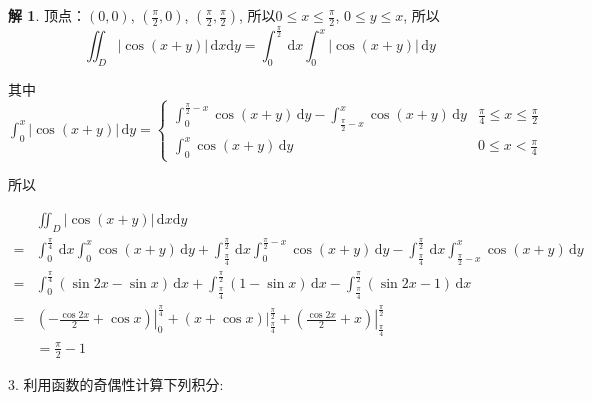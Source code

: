 \documentclass[a4paper,12pt]{article}
\theoremstyle{definition}
\newtheorem*{sol}{解}
\begin{document}
\begin{sol}
    顶点：$(0,0)$, $(\frac{\pi}{2},0)$, $(\frac{\pi}{2},\frac{\pi}{2})$, 所以$0\leq x\leq\frac{\pi}{2}$, $0\leq y\leq x$, 所以
    $$\iint_{D} \left|\cos(x+y)\right|\,\mathrm{d}x\mathrm{d}y=\int_0^{\frac{\pi}{2}}\,\mathrm{d}x\int_0^x \left|\cos(x+y)\right|\,\mathrm{d}y$$

    其中$\int_0^x\left|\cos(x+y)\right|\,\mathrm{d}y=\begin{cases}
            \int_0^{\frac{\pi}{2}-x}\cos(x+y)\,\mathrm{d}y-\int_{\frac{\pi}{2}-x}^x\cos(x+y)\,\mathrm{d}y & \frac{\pi}{4}\leq x\leq\frac{\pi}{2} \\
            \int_0^x\cos(x+y)\,\mathrm{d}y                                                                & 0\leq x<\frac{\pi}{4}
        \end{cases}$

    所以

    \begin{align*}
          & \iint_{D} \left|\cos(x+y)\right|\,\mathrm{d}x\mathrm{d}y                                     \\
        = & \int_0^{\frac{\pi}{4}}\,\mathrm{d}x\int_0^x \cos(x+y)\,\mathrm{d}y
        +\int_{\frac{\pi}{4}}^{\frac{\pi}{2}}\,\mathrm{d}x\int_0^{\frac{\pi}{2}-x}\cos(x+y)\,\mathrm{d}y
        -\int_{\frac{\pi}{4}}^{\frac{\pi}{2}}\,\mathrm{d}x\int_{\frac{\pi}{2}-x}^x\cos(x+y)\,\mathrm{d}y \\
        = & \int_0^{\frac{\pi}{4}}(\sin 2x-\sin x)\,\mathrm{d}x
        +\int_{\frac{\pi}{4}}^{\frac{\pi}{2}}(1-\sin x)\,\mathrm{d}x
        -\int_{\frac{\pi}{4}}^{\frac{\pi}{2}}(\sin 2x-1)\,\mathrm{d}x                                    \\
        = & \left.(-\frac{\cos 2x}{2}+\cos x)\right|_0^{\frac{\pi}{4}}
        +\left.(x+\cos x)\right|_{\frac{\pi}{4}}^{\frac{\pi}{2}}
        +\left.(\frac{\cos 2x}{2}+x)\right|_{\frac{\pi}{4}}^{\frac{\pi}{2}}                              \\
          & =\frac{\pi}{2}-1
    \end{align*}
\end{sol}


3. 利用函数的奇偶性计算下列积分:
\end{document}
